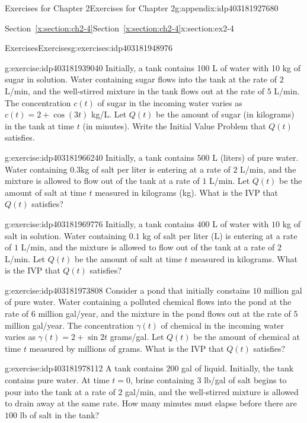 \documentclass[oneside,10pt,]{book}
\newcommand{\xreffont}{\relax}
\numberwithin{equation}{section}
\numberwithin{equation}{section}
\begin{document}
\begin{appendixptx}{Exercises for Chapter 2}{}{Exercises for Chapter 2}{}{}{g:appendix:idp403181927680}
\begin{sectionptx}{Section~{\xreffont\ref*{x:section:ch2-4}}}{}{Section~{\xreffont\ref*{x:section:ch2-4}}}{}{}{x:section:ex2-4}
\begin{exercises-subsection-numberless}{Exercises}{}{Exercises}{}{}{g:exercises:idp403181948976}
\begin{divisionexercise}{1}{}{}{g:exercise:idp403181939040}
Initially, a tank contains 100 L of water with 10 kg of sugar in solution. Water containing sugar flows into the tank at the rate of \(2\) L\slash{}min, and the well-stirred mixture in the tank flows out at the rate of \(5\) L\slash{}min. The concentration \(c(t)\) of sugar in the incoming water varies as \(c(t)=2+\cos(3t)\) kg\slash{}L. Let \(Q(t)\) be the amount of sugar (in kilograms) in the tank at time \(t\) (in minutes). Write the Initial Value Problem that \(Q(t)\) satisfies.%
\end{divisionexercise}%
\begin{divisionexercise}{2}{}{}{g:exercise:idp403181966240}%
Initially, a tank contains \(500\) L (liters) of pure water. Water containing \(0.3\)kg of salt per liter is entering at a rate of \(2\) L\slash{}min, and the mixture is allowed to flow out of the tank at a rate of \(1\) L\slash{}min. Let \(Q(t)\) be the amount of salt at time \(t\) measured in kilograms (kg). What is the IVP that \(Q(t)\) satisfies?%
\end{divisionexercise}%
\begin{divisionexercise}{3}{}{}{g:exercise:idp403181969776}%
Initially, a tank contains \(400\) L of water with \(10\) kg of salt in solution. Water containing \(0.1\) kg of salt per liter (L) is entering at a rate of \(1\) L\slash{}min, and the mixture is allowed to flow out of the tank at a rate of \(2\) L\slash{}min. Let \(Q(t)\) be the amount of salt at time \(t\) measured in kilograms. What is the IVP that \(Q(t)\) satisfies?%
\end{divisionexercise}%
\begin{divisionexercise}{4}{}{}{g:exercise:idp403181973808}%
Consider a pond that initially constains \(10\) million gal of pure water. Water containing a polluted chemical flows into the pond at the rate of \(6\) million gal\slash{}year, and the mixture in the pond flows out at the rate of \(5\) million gal\slash{}year. The concentration \(\gamma(t)\) of chemical in the incoming water varies as \(\gamma(t)=2+\sin2t\) grams\slash{}gal. Let \(Q(t)\) be the amount of chemical at time \(t\) measured by millions of grams. What is the IVP that \(Q(t)\) satisfies?%
\end{divisionexercise}%
\begin{divisionexercise}{5}{}{}{g:exercise:idp403181978112}%
A tank contains \(200\) gal of liquid. Initially, the tank contains pure water. At time \(t=0\), brine containing \(3\) lb\slash{}gal of salt begins to pour into the tank at a rate of \(2\) gal\slash{}min, and the well-stirred mixture is allowed to drain away at the same rate. How many minutes must elapse before there are \(100\) lb of salt in the tank?%

\end{divisionexercise}
\end{exercises-subsection-numberless}
\end{sectionptx}
\end{appendixptx}
\end{document}
